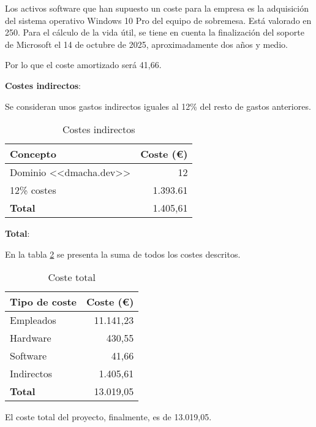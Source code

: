 Los activos software que han supuesto un coste para la empresa es la adquisición
del sistema operativo Windows 10 Pro del equipo de sobremesa. Está valorado en
250\texteuro. Para el cálculo de la vida útil, se tiene en cuenta la
finalización del soporte de Microsoft el 14 de octubre de 2025, aproximadamente
dos años y medio.

Por lo que el coste amortizado será 41,66\texteuro.

\clearpage
\textbf{Costes indirectos}:

Se consideran unos gastos indirectos iguales al 12\% del resto de gastos
anteriores. 

\begin{table}[H]
    \centering
\begin{tabular}{lr}
\toprule
\textbf{Concepto}      & \textbf{Coste (€)}     \\ \midrule
Dominio <<dmacha.dev>>     & 12                    \\
12\% costes                 & 1.393.61                     \\ \midrule
\textbf{Total}       & 1.405,61                     \\ \midrule
\end{tabular}
\caption{Costes indirectos}
\label{tabla:indirectos}
\end{table}


\textbf{Total}:

En la tabla \ref{tabla:total} se presenta la suma de todos los costes descritos.

\begin{table}[H]
    \centering
\begin{tabular}{lr}
\toprule
\textbf{Tipo de coste}     & \textbf{Coste (€)}     \\ \midrule
Empleados                  & 11.141,23                    \\
Hardware                   & 430,55                     \\
Software                   & 41,66                     \\
Indirectos                 & 1.405,61                     \\ \midrule
\textbf{Total}             & 13.019,05                     \\ \midrule
\end{tabular}
\caption{Coste total}
\label{tabla:total}
\end{table}

El coste total del proyecto, finalmente, es de 13.019,05\texteuro.


